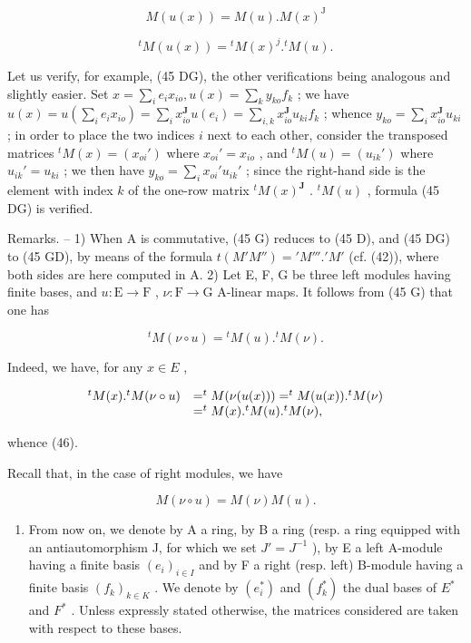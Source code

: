 \[
M (u (x)) = M (u). M (x) ^ {\mathrm{J}}\tag{45 GD}
\]

\[
{ } ^ { t } M ( u ( x ) ) = { } ^ { t } M ( x ) ^ { j } . { } ^ { t } M ( u ) .\tag{45 DG}
\]

Let us verify, for example, (45 DG), the other verifications being analogous and slightly easier. Set \(x = \sum_{i} e_i x_{io}, u(x) = \sum_{k} y_{ko} f_k\) ; we have \(u(x) = u(\sum_{i} e_i x_{io}) = \sum_{i} x_{io}^{\mathbf{J}} u(e_i) = \sum_{i,k} x_{io}^{\mathbf{J}} u_{ki} f_k\) ; whence \(y_{ko} = \sum_{i} x_{io}^{\mathbf{J}} u_{ki}\) ; in order to place the two indices \(i\) next to each other, consider the transposed matrices \(^t M(x) = (x_{oi}')\) where \(x_{oi}' = x_{io}\) , and \(^t M(u) = (u_{ik}')\) where \(u_{ik}' = u_{ki}\) ; we then have \(y_{ko} = \sum_{i} x_{oi}' u_{ik}'\) ; since the right-hand side is the element with index \(k\) of the one-row matrix \(^t M(x)^{\mathbf{J}}\) . \(^t M(u)\) , formula (45 DG) is verified.

Remarks. -- 1) When A is commutative, (45 G) reduces to (45 D), and (45 DG) to (45 GD), by means of the formula \(t(M'M'') = 'M'''.'M'\) (cf. (42)), where both sides are here computed in A. 2) Let E, F, G be three left modules having finite bases, and \(u: \mathrm{E} \to \mathrm{F}\) , \(\nu: \mathrm{F} \to \mathrm{G}\) A-linear maps. It follows from (45 G) that one has

\[
{ } ^ { t } M ( \nu \circ u ) = { } ^ { t } M ( u ) . { } ^ { t } M ( \nu ) .\tag{46}
\]

Indeed, we have, for any \(x \in E\) ,

\[
\begin{array}{r l} ^ {t} M (x). ^ {t} M (\nu \circ u) & = ^ {t} M (\nu (u (x))) = ^ {t} M (u (x)). ^ {t} M (\nu) \\ & = ^ {t} M (x). ^ {t} M (u). ^ {t} M (\nu), \end{array}
\]

whence (46).

Recall that, in the case of right modules, we have

\[
M (\nu \circ u) = M (\nu) M (u).
\]

\begin{enumerate}
\def\labelenumi{\Roman{enumi}.}
\setcounter{enumi}{2}
\tightlist
\item
  From now on, we denote by A a ring, by B a ring (resp. a ring equipped with an antiautomorphism J, for which we set \(J' = J^{-1}\) ), by E a left A-module having a finite basis \((e_i)_{i \in I}\) and by F a right (resp. left) B-module having a finite basis \((f_k)_{k \in K}\) . We denote by \((e_i^*)\) and \((f_k^*)\) the dual bases of \(E^*\) and \(F^*\) . Unless expressly stated otherwise, the matrices considered are taken with respect to these bases.
\end{enumerate}

